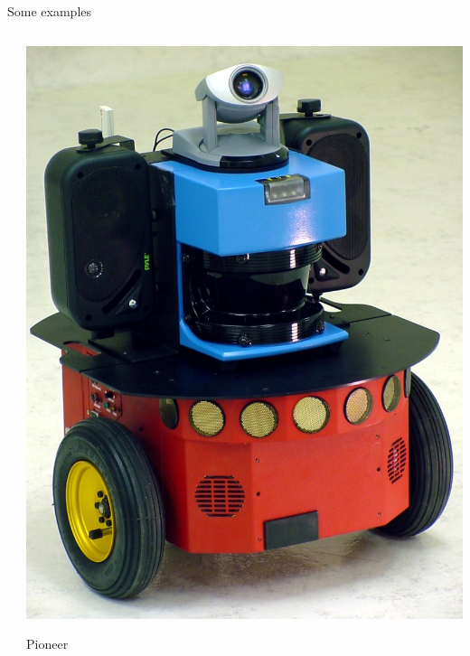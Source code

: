 \documentclass[compress]{beamer}
\begin{document}
\begin{frame}{Some examples}
\begin{columns}
\begin{column}{0.5\linewidth}
        \end{column}
        \begin{column}{0.5\linewidth}
            \begin{center}
                \includegraphics[width=0.7\linewidth]{differentialdrive_ex2}

                Pioneer
            \end{center}

        \end{column}
    \end{columns}
\end{frame}
\end{document}
